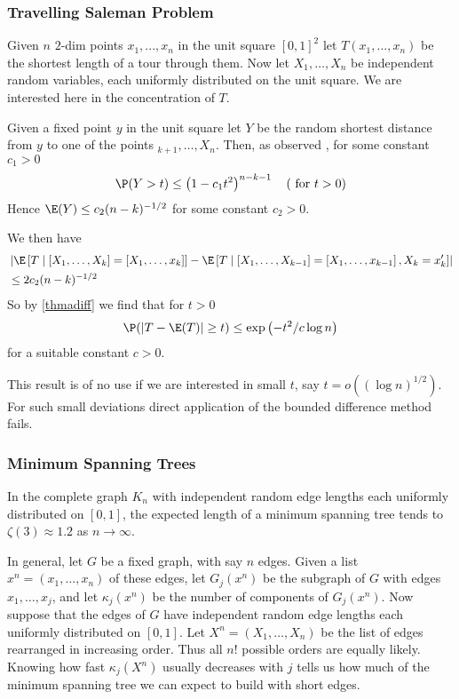 \documentclass{article}
\begin{document}
\subsubsection{Travelling Saleman Problem}
Given $n$ $2$-dim points $x_1,...,x_n$ in the unit square $[0,1]^{2}$ let $T\left(x_1,...,x_n\right)$ be the shortest length of a tour through them. Now let $X_{1}, \ldots, X_{n}$ be independent random variables, each uniformly distributed on the unit square. We are interested here in the concentration of $T$.

Given a fixed point $y$ in the unit square let $Y$ be the random shortest
distance from $y$ to one of the points $_{ k +1}, \ldots, X_{ n } .$ Then, as observed \cite{steele1981complete}, for some constant $c_{1}>0$
$$
\P (Y>t) \leq\left(1-c_{1} t^{2}\right)^{n-k-1} \quad(\text { for } t>0)
$$
Hence $\E ( Y ) \leq c _{2}( n - k )^{-1 / 2}$ for some constant $c _{2}>0$. 

We then have
\begin{align*}
   & \left|\E\left[ T \mid\left[X_{1}, \ldots, X_{ k }\right]=\left[X_{1}, \ldots, x_{k}\right]\right]- \E \left[ T \mid\left[X_{1}, \ldots, X_{ k -1}\right]=\left[X_{1}, \ldots, x_{ k -1}\right], X_{ k }=x_{ k }^{\prime}\right]\right|\\
&\leq 2 c_{2}(n-k)^{-1 / 2}
\end{align*}
So by \cref{thmadiff} we find that for $t>0$
$$\P(|T-\E(T)| \geq t) \leq \exp \left(-t^{2} / c\log n\right)$$
for a suitable constant $c>0$. 
\begin{rema}
This result is of no use if we are interested in small $t$, say $t=o\left((\log n)^{1 / 2}\right).$ For such small deviations direct application of the bounded difference method fails.
\end{rema}

\subsubsection{Minimum Spanning Trees}
In the complete graph $K _{ n }$ with independent random edge lengths each uniformly distributed on $[0,1]$, the expected length of a minimum spanning tree tends to $\zeta(3) \approx 1.2$ as $n \to \infty$. 

In general, let $G$ be a fixed graph, with say $n$ edges.
Given a list $x^n=\left(x_{1}, \ldots, x_{n}\right)$ of these edges, let $G_{j}(x^n)$ be the subgraph of $G$ with edges $x_{1}, \ldots, x_{j}$, and let $\kappa_{j}(x^n)$ be the number of components of $G_{j}(x^n) .$ Now suppose that the edges of $G$ have independent random edge lengths each uniformly
distributed on $[0,1] .$ Let $X^n=\left(X_{1}, \ldots, X_{n}\right)$ be the list of edges rearranged in increasing order. Thus all $n!$ possible orders are equally likely. Knowing how fast
$\kappa_{ j }( X^n )$ usually decreases with $j$ tells us how much of the minimum spanning tree we can expect to build with short edges.
\end{document}
